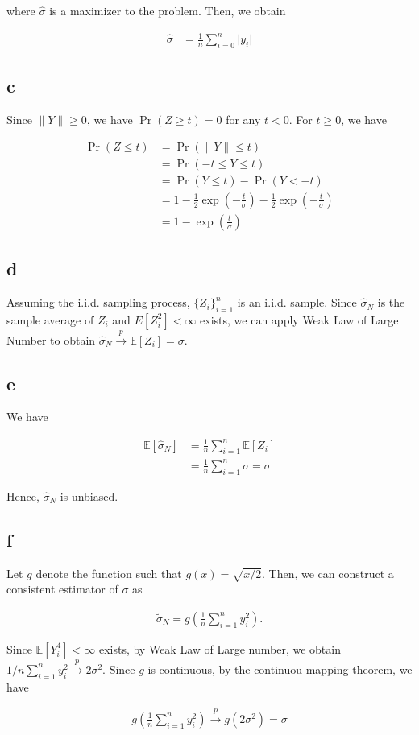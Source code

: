 \documentclass[11pt]{article}
\newcommand{\E}{\mathbb{E}}
\renewcommand{\hat}{\widehat}
\renewcommand{\tilde}{\widetilde}
\newcommand{\pto}{\overset{p}\rightarrow}
\theoremstyle{definition}
\begin{document}
where $\hat{\sigma}$ is a maximizer to the problem. Then, we obtain

\begin{align*}
    \hat{\sigma} &= \frac{1}{n} \sum_{i=0}^{n} \lvert y_i \rvert
\end{align*}

\subsection*{c}

Since $\lVert Y \rVert \geq 0$, we have $\Pr(Z \geq t) = 0$ for any $t < 0$. For $t \geq 0$, we have

\begin{align*}
    \Pr(Z \leq t)
    &= \Pr(\lVert Y \rVert \leq t) \\
    &= \Pr(-t \leq Y \leq t) \\
    &= \Pr( Y \leq t) - \Pr(Y < - t) \\
    &= 1 - \frac{1}{2}\exp(- \frac{t}{\sigma}) - \frac{1}{2} \exp( - \frac{t}{\sigma}) \\
    &= 1 - \exp(\frac{t}{\sigma})
\end{align*}

\subsection*{d}

Assuming the i.i.d. sampling process, $\{Z_i\}_{i=1}^n$  is an i.i.d. sample. Since $\hat{\sigma}_N$ is the sample average of $Z_i$ and $E[Z_i^2] < \infty$ exists, we can apply Weak Law of Large Number to obtain $\hat{\sigma}_N \pto \E[Z_i] = \sigma$.

\subsection*{e}

We have

\begin{align*}
    \E[\hat{\sigma}_N]
    &= \frac{1}{n} \sum_{i=1}^{n}\E[Z_i] \\
    &= \frac{1}{n} \sum_{i=1}^{n} \sigma = \sigma
\end{align*}

Hence, $\hat{\sigma}_N$ is unbiased.

\subsection*{f}

Let $g$ denote the function such that $g(x) = \sqrt{x/2}$. Then, we can construct a consistent estimator of $\sigma$ as

\begin{align*}
    \tilde{\sigma}_N = g(\frac{1}{n} \sum_{i=1}^{n}y_i^2).
\end{align*}

Since $\E[Y_i^4] < \infty$ exists, by Weak Law of Large number, we obtain $ 1/n\sum_{i=1}^{n} y_i^2 \pto 2 \sigma^2$. Since $g$ is continuous, by the continuou mapping theorem, we have

\begin{align*}
    g( \frac{1}{n} \sum_{i=1}^{n} y_i^2) \pto g(2\sigma^2) = \sigma
\end{align*}
\end{document}
